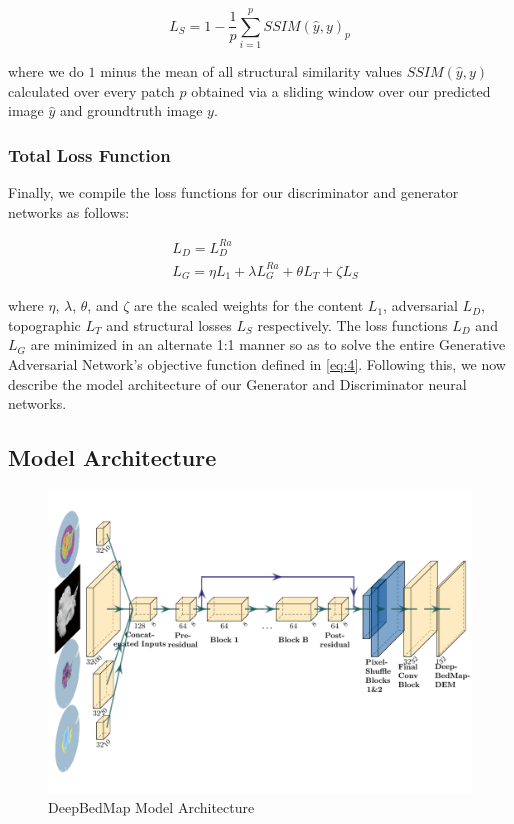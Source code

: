 \documentclass[tc, manuscript]{copernicus}
\begin{document}
\begin{equation}\label{eq:10}
  L_S = 1 - \dfrac{1}{p} \sum\limits_{i=1}^p SSIM(\hat{y}, y)_p
\end{equation}

where we do $1$ minus the mean of all structural similarity values $SSIM(\hat{y}, y)$ calculated over every patch $p$ obtained via a sliding window over our predicted image ${\hat{y}}$ and groundtruth image $y$.

\subsubsection{Total Loss Function}

Finally, we compile the loss functions for our discriminator and generator networks as follows:

\begin{align}
  & L_D = L_D^{Ra} \\
  & L_G = \eta L_1 + \lambda L_G^{Ra} + \theta L_T + \zeta L_S
\end{align}

where $\eta$, $\lambda$, $\theta$, and $\zeta$ are the scaled weights for the content $L_1$, adversarial $L_D$, topographic $L_T$ and structural losses $L_S$ respectively.
The loss functions $L_D$ and $L_G$ are minimized in an alternate 1:1 manner so as to solve the entire Generative Adversarial Network's objective function defined in \eqref{eq:4}.
Following this, we now describe the model architecture of our Generator and Discriminator neural networks.

\subsection{Model Architecture}

\begin{figure}[h]
  \includegraphics[width=16cm]{figures/deepbedmap_architecture.pdf}
  \caption{DeepBedMap Model Architecture}
  \label{}
\end{figure}
\end{document}
